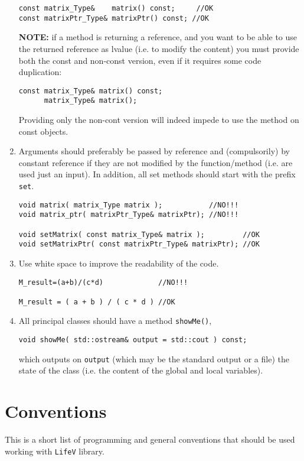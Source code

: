 \documentclass[10p]{article}
\begin{document}
\begin{enumerate}
\begin{lstlisting}
const matrix_Type&    matrix() const;     //OK
const matrixPtr_Type& matrixPtr() const; //OK
\end{lstlisting}
\textbf{NOTE:} if a method is returning a reference, and you want to be able to use the returned reference as lvalue (i.e. to modify the content) you must provide both the const and non-const version, even if it requires some code duplication:
\begin{lstlisting}
const matrix_Type& matrix() const;
      matrix_Type& matrix();
\end{lstlisting}
Providing only the non-cont version will indeed impede to use the method on const objects.
  \item Arguments should preferably be passed by reference and (compulsorily) by constant reference if they are not modified by the function/method
(i.e. are used just an input). In addition, all set methods should start with the prefix \texttt{set}.
\begin{lstlisting}
void matrix( matrix_Type matrix );           //NO!!!
void matrix_ptr( matrixPtr_Type& matrixPtr); //NO!!!

void setMatrix( const matrix_Type& matrix );         //OK
void setMatrixPtr( const matrixPtr_Type& matrixPtr); //OK
\end{lstlisting}
  \item Use white space to improve the readability of the code.
\begin{lstlisting}
M_result=(a+b)/(c*d)             //NO!!!

M_result = ( a + b ) / ( c * d ) //OK
\end{lstlisting}
  \item All principal classes should have a method \texttt{showMe()},
\begin{lstlisting}
void showMe( std::ostream& output = std::cout ) const;
\end{lstlisting}
  which outputs on \texttt{output} (which may be the standard output or a file) the state of the class (i.e.  the content of the global and local variables).
\end{enumerate}

\section{Conventions}
This is a short list of programming and general conventions that should be used working with \texttt{LifeV} library.
\end{document}
